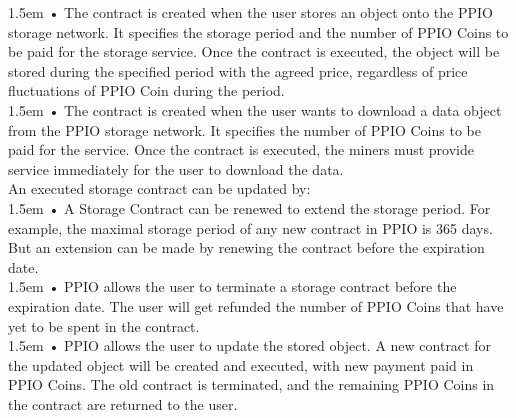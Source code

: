 \documentclass[10pt,a4paper]{article}
\begin{document}
\hangindent 1.5em
\noindent   
• 
The contract is created when the user stores an object onto the PPIO storage network. It specifies the storage period and the number of PPIO Coins to be paid for the storage service. Once the contract is executed, the object will be stored during the specified period with the agreed price, regardless of price fluctuations of PPIO Coin during the period.
 \vspace{-0.8em}
\\

\hangindent 1.5em
\noindent   
•
The contract is created when the user wants to download a data object from the PPIO storage network. It specifies the number of PPIO Coins to be paid for the service. Once the contract is executed, the miners must provide service immediately for the user to download the data.
 \vspace{-0.6em}
\\

\noindent   
An executed storage contract can be updated by:
 \vspace{-0.8em}
\\

\hangindent 1.5em
\noindent   
• 
A Storage Contract can be renewed to extend the storage period. For example, the maximal storage period of any new contract in PPIO is 365 days. But an extension can be made by renewing the contract before the expiration date.
 \vspace{-0.8em}
\\

\hangindent 1.5em
\noindent   
•
PPIO allows the user to terminate a storage contract before the expiration date. The user will get refunded the number of PPIO Coins that have yet to be spent in the contract.
 \vspace{-0.8em}
\\

\hangindent 1.5em
\noindent   
•
PPIO allows the user to update the stored object. A new contract for the updated object will be created and executed, with new payment paid in PPIO Coins. The old contract is terminated, and the remaining PPIO Coins in the contract are returned to the user.
 \vspace{-0.5em}
\end{document}
